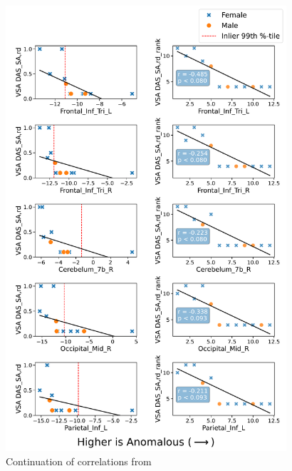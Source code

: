 \begin{figure}[h!]
\centering
\includegraphics[width=0.93\textwidth, height=1.46\textwidth]{figures/rankcorrplot-fig2.pdf}
\caption{Continuation of correlations from~}
\label{fig:roi-scatter-cont}
\end{figure}


